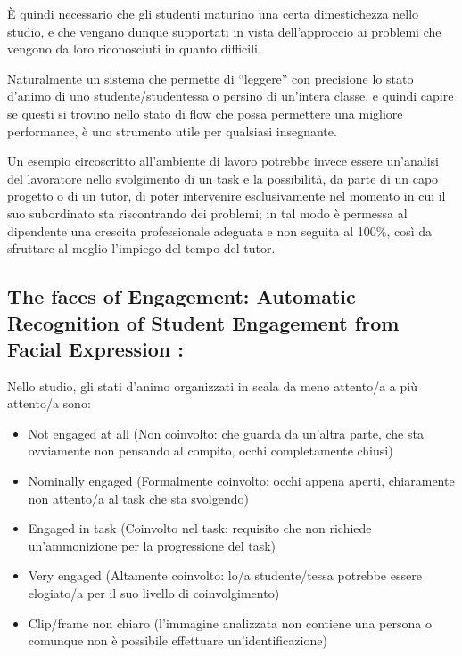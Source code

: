 È quindi necessario che gli studenti maturino una certa dimestichezza nello studio, e che vengano dunque supportati in vista dell’approccio ai problemi che vengono da loro riconosciuti in quanto difficili.

Naturalmente un sistema che permette di “leggere” con precisione lo stato d’animo di uno studente/studentessa o persino di un’intera classe, e quindi capire se questi si trovino nello stato di flow che possa permettere una migliore performance, è uno strumento utile per qualsiasi insegnante.

Un esempio circoscritto all’ambiente di lavoro potrebbe invece essere un’analisi del lavoratore nello svolgimento di un task e la possibilità, da parte di un capo progetto o di un tutor, di poter intervenire esclusivamente nel momento in cui il suo subordinato sta riscontrando dei problemi; in tal modo è permessa al dipendente una crescita professionale adeguata e non seguita al 100\%, così da sfruttare al meglio l’impiego del tempo del tutor.

\subsection {The faces of Engagement: Automatic Recognition of Student Engagement from Facial Expression \cite{FacesOfEngagement}:}

Nello studio, gli stati d’animo organizzati in scala da meno attento/a a più attento/a sono:
\begin{itemize}
    \item Not engaged at all (Non coinvolto: che guarda da un’altra parte, che sta ovviamente non pensando al compito, occhi completamente chiusi)
    \item Nominally engaged (Formalmente coinvolto: occhi appena aperti, chiaramente non attento/a al task che sta svolgendo)
    \item Engaged in task (Coinvolto nel task: requisito che non richiede un’ammonizione per la progressione del task)
    \item Very engaged (Altamente coinvolto: lo/a studente/tessa potrebbe essere elogiato/a per il suo livello di coinvolgimento)
    \item Clip/frame non chiaro (l’immagine analizzata non contiene una persona o comunque non è possibile effettuare un’identificazione)
\end{itemize}

